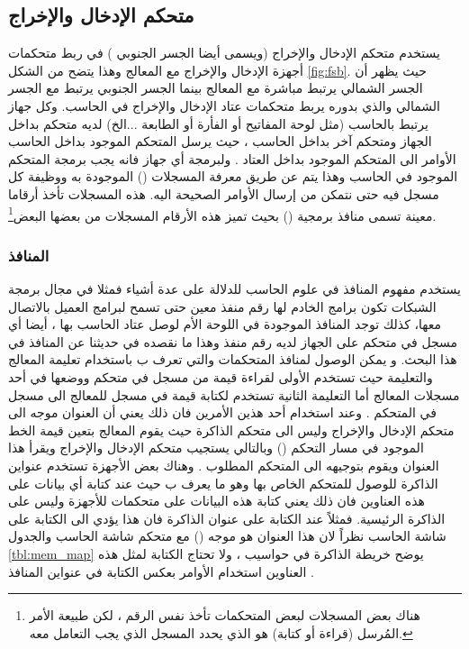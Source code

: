 \documentclass[document.tex]{subfiles}
\begin{document}
\subsection{متحكم الإدخال والإخراج}
يستخدم متحكم  الإدخال والإخراج (ويسمى أيضا الجسر الجنوبي ) في ربط متحكمات أجهزة الإدخال والإخراج مع المعالج وهذا يتضح من الشكل \ref{fig:fsb}. حيث يظهر أن الجسر الشمالي يرتبط مباشرة مع المعالج بينما الجسر الجنوبي يرتبط مع الجسر الشمالي والذي بدوره يربط متحكمات عتاد الإدخال والإخراج في الحاسب.
وكل جهاز يرتبط بالحاسب (مثل لوحة المفاتيح أو الفأرة أو الطابعة ...الخ) لديه متحكم بداخل الجهاز ومتحكم آخر بداخل الحاسب ، حيث يرسل المتحكم الموجود بداخل الحاسب الأوامر الى المتحكم الموجود بداخل العتاد . ولبرمجة أي جهاز فانه يجب برمجة المتحكم الموجود في الحاسب وهذا يتم عن طريق معرفة المسجلات () الموجودة به ووظيفة كل مسجل فيه حتى نتمكن من إرسال الأوامر الصحيحة اليه. هذه المسجلات تأخذ أرقاما معينة تسمى منافذ برمجية ()  بحيث تميز هذه الأرقام المسجلات من بعضها البعض\footnote{هناك بعض المسجلات لبعض المتحكمات تأخذ نفس الرقم ، لكن طبيعة الأمر المُرسل (قراءة أو كتابة) هو الذي يحدد المسجل الذي يجب التعامل معه.}.

\subsubsection{المنافذ }
يستخدم مفهوم المنافذ في علوم الحاسب للدلالة على عدة أشياء فمثلا في مجال برمجة الشبكات تكون برامج الخادم لها رقم منفذ معين حتى تسمح لبرامج العميل بالاتصال معها، كذلك توجد المنافذ الموجودة في اللوحة الأم لوصل عتاد الحاسب بها ، أيضا أي مسجل في متحكم على الجهاز لديه رقم منفذ وهذا ما نقصده في حديثنا عن المنافذ في هذا البحث.
و يمكن الوصول لمنافذ المتحكمات والتي تعرف ب  باستخدام تعليمة المعالج  والتعليمة  حيث تستخدم الأولى لقراءة قيمة من مسجل في متحكم ووضعها في أحد مسجلات المعالج أما التعليمة الثانية تستخدم لكتابة قيمة في مسجل للمعالج الى مسجل في المتحكم . وعند استخدام أحد هذين الأمرين فان ذلك يعني أن العنوان موجه الى متحكم الإدخال والإخراج وليس الى متحكم الذاكرة حيث يقوم المعالج بتعين قيمة الخط  الموجود في مسار التحكم ()  وبالتالي يستجيب متحكم الإدخال والإخراج ويقرأ هذا العنوان ويقوم بتوجيهه الى المتحكم المطلوب . وهناك بعض الأجهزة تستخدم عنواين الذاكرة للوصول للمتحكم الخاص بها وهو ما يعرف ب  حيث عند كتابة أي بيانات على هذه العناوين فان ذلك يعني كتابة هذه البيانات على متحكمات للأجهزة وليس على الذاكرة الرئيسية. فمثلاً عند الكتابة على عنوان الذاكرة  فان هذا يؤدي الى الكتابة على شاشة الحاسب نظراً لان هذا العنوان هو موجه () مع متحكم شاشة الحاسب والجدول \ref{tbl:mem_map} يوضح خريطة الذاكرة في حواسيب ، ولا تحتاج الكتابة لمثل هذه العناوين استخدام الأوامر  بعكس الكتابة في عنواين المنافذ  .
\end{document}
